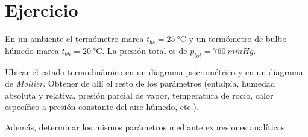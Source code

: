 \section{Ejercicio}\label{ej:Chap12Ejercicio02}
En un ambiente el termómetro marca $t_{bs}=\SI{25}{\celsius}$ y un termómetro de bulbo húmedo marca $t_{bh}=\SI{20}{\celsius}$. La presión total es de $p_{tot}=\SI{760}{mmHg}$.

Ubicar el estado termodinámico en un diagrama psicrométrico y en un diagrama de \textit{Mollier}. Obtener de allí el resto de los parámetros (entalpía, humedad absoluta y relativa, presión parcial de vapor, temperatura de rocío, calor específico a presión constante del aire húmedo, etc.).

Además, determinar los mismos parámetros mediante expresiones analíticas.